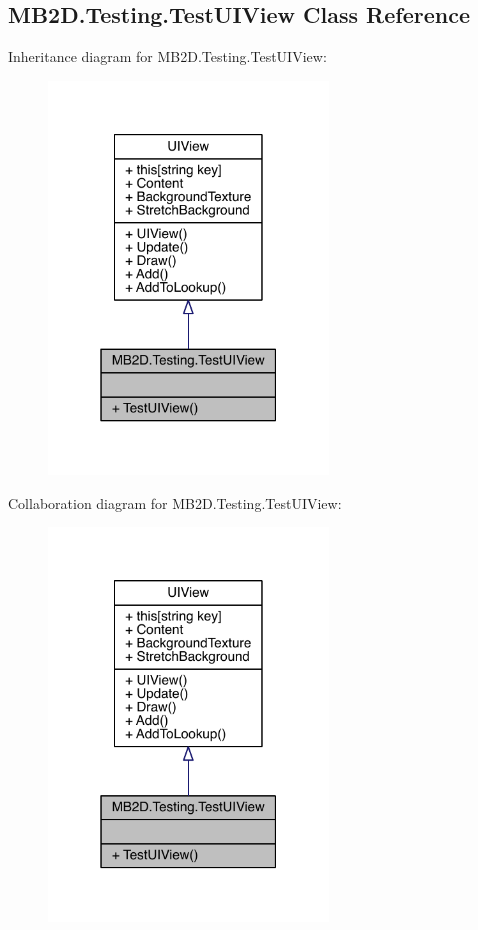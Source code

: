 \hypertarget{class_m_b2_d_1_1_testing_1_1_test_u_i_view}{}\subsection{M\+B2\+D.\+Testing.\+Test\+U\+I\+View Class Reference}
\label{class_m_b2_d_1_1_testing_1_1_test_u_i_view}


Inheritance diagram for M\+B2\+D.\+Testing.\+Test\+U\+I\+View\+:
\nopagebreak
\begin{figure}[H]
\begin{center}
\leavevmode
\includegraphics[width=211pt]{class_m_b2_d_1_1_testing_1_1_test_u_i_view__inherit__graph}
\end{center}
\end{figure}


Collaboration diagram for M\+B2\+D.\+Testing.\+Test\+U\+I\+View\+:
\nopagebreak
\begin{figure}[H]
\begin{center}
\leavevmode
\includegraphics[width=211pt]{class_m_b2_d_1_1_testing_1_1_test_u_i_view__coll__graph}
\end{center}
\end{figure}
